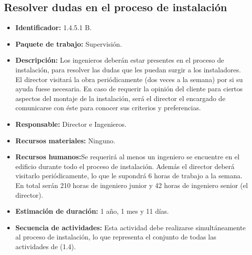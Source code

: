 \subsection{Resolver dudas en el proceso de instalación}
\begin{itemize}
\item \textbf{Identificador: }1.4.5.1 B.
\item \textbf{Paquete de trabajo: }Supervisión.
\item \textbf{Descripción: }Los ingenieros deberán estar presentes en el proceso de instalación, para resolver las dudas que les puedan surgir a los instaladores. El director visitará la obra periódicamente (dos veces a la semana) por si su ayuda fuese necesaria. En caso de requerir la opinión del cliente para ciertos aspectos del montaje de la instalación, será el director el encargado de comunicarse con éste para conocer sus criterios y preferencias.
\item \textbf{Responsable: }Director e Ingenieros.
\item \textbf{Recursos materiales: }Ninguno.
\item \textbf{Recursos humanos:}Se requerirá al menos un ingeniero se encuentre en el edificio durante todo el proceso de instalación. Además el director deberá visitarlo periódicamente, lo que le supondrá 6 horas de trabajo a la semana. En total serán 210 horas de ingeniero junior y 42 horas de ingeniero senior (el director).
\item \textbf{Estimación de duración: }1 año, 1 mes y 11 días.
\item \textbf{Secuencia de actividades: } Esta actividad debe realizarse simultáneamente al proceso de instalación, lo que representa el conjunto de todas las actividades de (1.4).
\end{itemize}

